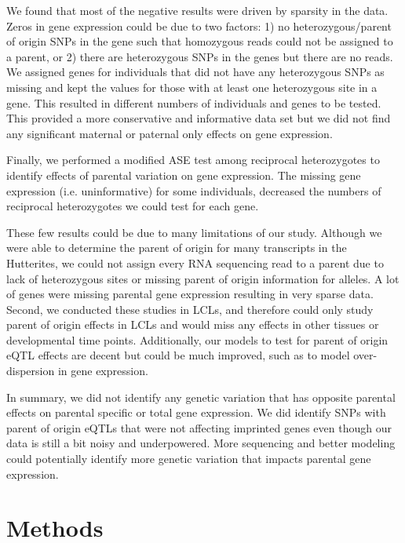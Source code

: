 We found that most of the negative results were driven by sparsity in the data. Zeros in gene expression could be due to two factors: 1) no heterozygous/parent of origin SNPs in the gene such that homozygous reads could not be assigned to a parent, or 2) there are heterozygous SNPs in the genes but there are no reads. We assigned genes for individuals that did not have any heterozygous SNPs as missing and kept the values for those with at least one heterozygous site in a gene. This resulted in different numbers of individuals and genes to be tested. This provided a more conservative and informative data set but we did not find any significant maternal or paternal only effects on gene expression.

Finally, we performed a modified ASE test among reciprocal heterozygotes to identify effects of parental variation on gene expression. The missing gene expression (i.e. uninformative) for some individuals, decreased the numbers of reciprocal heterozygotes we could test for each gene.

These few results could be due to many limitations of our study. Although we were able to determine the parent of origin for many transcripts in the Hutterites, we could not assign every RNA sequencing read to a parent due to lack of heterozygous sites or missing parent of origin information for alleles. A lot of genes were missing parental gene expression resulting in very sparse data. Second, we conducted these studies in LCLs, and therefore could only study parent of origin effects in LCLs and would miss any effects in other tissues or developmental time points. Additionally, our models to test for parent of origin eQTL effects are decent but could be much improved, such as to model over-dispersion in gene expression.

In summary, we did not identify any genetic variation that has opposite parental effects on parental specific or total gene expression. We did identify SNPs with parent of origin eQTLs that were not affecting imprinted genes even though our data is still a bit noisy and underpowered. More sequencing and better modeling could potentially identify more genetic variation that impacts parental gene expression.

\section{Methods}\label{ch04-methods}

